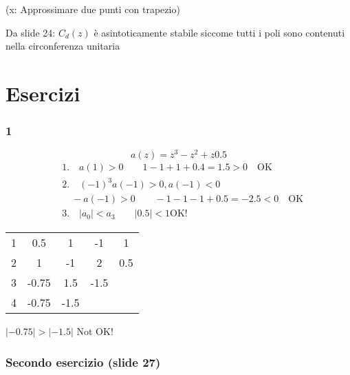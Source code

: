 \documentclass{article}
\begin{document}

(x: Approssimare due  punti con trapezio)

Da slide 24: $C_d(z)$ \`e asintoticamente stabile siccome tutti i poli sono contenuti nella circonferenza unitaria






\newpage
\section{Esercizi}


\subsubsection{1}

\[ a(z) = z^3 - z^2 + z  0.5 \]
\begin{align*}
    &1.\quad a(1) > 0 \qquad 1 - 1 + 1 + 0.4 = 1.5 > 0 \quad \text{OK}\\
    &2.\quad (-1)^3 a(-1) > 0, a(-1) < 0\\
    & \quad -a(-1) > 0 \qquad -1 -1 -1 +0.5 = -2.5 < 0 \quad \text{OK}\\
    &3.\quad  |a_0| < a_3 \qquad |0.5| < 1 \text{OK!}
\end{align*}

\begin{tabular}{c|c c c c}
    1 & 0.5 & 1&  -1 & 1\\
    2 & 1 & -1 & 2 & 0.5\\
    3 & -0.75 & 1.5 & -1.5\\
    4 & -0.75 & -1.5 & &
\end{tabular}

\bigbreak
$|-0.75| > |-1.5|$ Not OK!

\subsubsection{Secondo esercizio (slide 27)}
\end{document}
